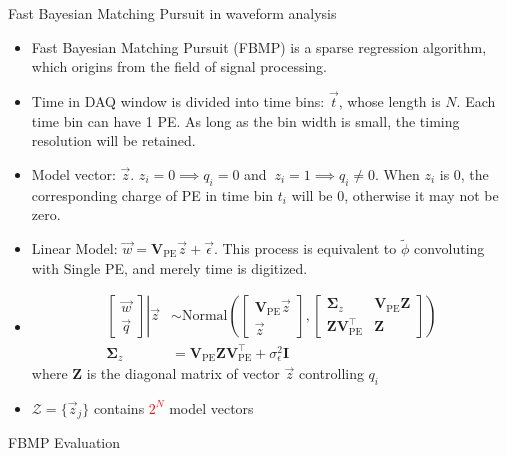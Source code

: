 \documentclass[final]{beamer}
\newlength{\colwidth}
\begin{document}
\begin{frame}[t]
\begin{columns}[t]
\begin{column}{\colwidth}
\begin{block}{Fast Bayesian Matching Pursuit\cite{schniter_fast_nodate} in waveform analysis}
    \begin{itemize}
      \item Fast Bayesian Matching Pursuit (FBMP) is a sparse regression algorithm, which origins from the field of signal processing. 
      \item Time in DAQ window is divided into time bins: $\vec{t}$, whose length is $N$. Each time bin can have 1 PE. As long as the bin width is small, the timing resolution will be retained. 
      \item Model vector: $\vec{z}$. $z_i=0\implies q_i=0$ and $\ z_i=1\implies q_i\neq0$. When $z_i$ is 0, the corresponding charge of PE in time bin $t_i$ will be 0, otherwise it may not be zero. 
      \item Linear Model: $\vec{w} = \bm{V}_\mathrm{PE}\vec{z} + \vec{\epsilon}$. This process is equivalent to $\tilde{\phi}$ convoluting with Single PE, and merely time is digitized. 
      \item 
          \begin{align*}
              \left.
              \begin{bmatrix}
                  \vec{w} \\
                  \vec{q}
              \end{bmatrix}
              \right\vert\vec{z}
              &\sim \mathrm{Normal}\left(
              \begin{bmatrix}
                  \bm{V}_\mathrm{PE}\vec{z} \\
                  \vec{z}
              \end{bmatrix}, 
              \begin{bmatrix}
                  \bm{\Sigma}_z & \bm{V}_\mathrm{PE}\bm{Z} \\
                  \bm{Z}\bm{V}_\mathrm{PE}^\intercal & \bm{Z}
              \end{bmatrix}
              \right) \\
              \bm{\Sigma}_z &= \bm{V}_\mathrm{PE}\bm{Z}\bm{V}_\mathrm{PE}^\intercal+\sigma_\epsilon^2\bm{I}
          \end{align*}
        where $\bm{Z}$ is the diagonal matrix of vector $\vec{z}$ controlling $q_i$ 
        \item $\mathcal{Z}=\{\vec{z}_j\}$ contains \textcolor{red}{$2^{N}$} model vectors
    \end{itemize}

  \end{block}

  \begin{block}{FBMP Evaluation}


\end{block}
\end{column}
\end{columns}
\end{frame}
\end{document}
